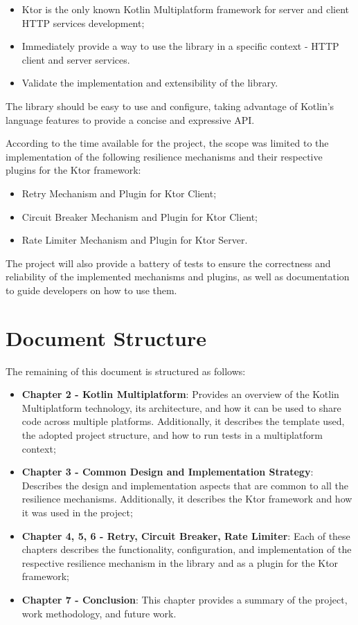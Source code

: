 \begin{itemize}
    \item Ktor is the only known Kotlin Multiplatform framework for server and client HTTP services development;
    \item Immediately provide a way to use the library in a specific context - HTTP client and server services.
    \item Validate the implementation and extensibility of the library.
\end{itemize}

The library should be easy to use and configure, taking advantage of Kotlin's language features to provide a concise and expressive API.

According to the time available for the project, the scope was limited to the implementation of the following resilience mechanisms and their respective plugins for the Ktor framework:

\begin{itemize}
    \item Retry Mechanism and Plugin for Ktor Client;
    \item Circuit Breaker Mechanism and Plugin for Ktor Client;
    \item Rate Limiter Mechanism and Plugin for Ktor Server.
\end{itemize}

The project will also provide a battery of tests
to ensure the correctness and reliability of the implemented mechanisms and plugins,
as well as documentation to guide developers on how to use them.


\section{Document Structure}\label{sec:document-structure}

The remaining of this document is structured as follows:

\begin{itemize}
    \item \textbf{Chapter 2 - Kotlin Multiplatform}: Provides an overview of the Kotlin Multiplatform technology, its architecture, and how it can be used to share code across multiple platforms.
    Additionally, it describes the template used, the adopted project structure, and how to run tests in a multiplatform context;
    \item \textbf{Chapter 3 - Common Design and Implementation Strategy}: Describes the design and implementation aspects that are common to all the resilience mechanisms.
    Additionally, it describes the Ktor framework and how it was used in the project;
    \item \textbf{Chapter 4, 5, 6 - Retry, Circuit Breaker, Rate Limiter}: Each of these chapters describes the functionality, configuration, and implementation of the respective resilience mechanism in the library and as a plugin for the Ktor framework;
    \item \textbf{Chapter 7 - Conclusion}: This chapter provides a summary of the project, work methodology, and future work.
\end{itemize}
